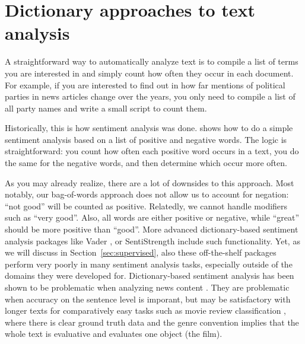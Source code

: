\section{Dictionary approaches to text analysis}
\label{sec:dictionary}

A straightforward way to automatically analyze text is to compile a
list of terms you are interested in and simply count how often they
occur in each document. For example, if you are interested to find out
in how far mentions of political parties in news articles change over
the years, you only need to compile a list of all party names and
write a small script to count them.

Historically, this is how sentiment analysis was
done.  shows how to do a simple sentiment analysis
based on a list of positive and negative words. The logic is
straightforward: you count how often each positive word occurs in a
text, you do the same for the negative words, and then determine which
occur more often.




As you may already realize, there are a lot of downsides to this
approach. Most notably, our bag-of-words approach does not allow us to
account for negation: ``not good'' will be counted as
positive. Relatedly, we cannot handle modifiers such as ``very
good''. Also, all words are either positive or negative, while
``great'' should be more positive than ``good''. More advanced
dictionary-based sentiment analysis packages like Vader \citep{Hutto2014},
or SentiStrength \citep{Thelwall2012} include such functionality. Yet, as we will
discuss in Section~\ref{sec:supervised}, also these off-the-shelf
packages perform very poorly in many sentiment analysis tasks,
especially outside of the domains they were developed for.
Dictionary-based sentiment analysis has been shown to be problematic
when analyzing news content \citep[e.g.][]{Gonzalez-Bailon2015,
  Boukes2019}. They are problematic when accuracy on the sentence
level is imporant, but may be satisfactory with longer texts for
comparatively easy tasks such as movie review classification
\citep{Reagan2017}, where there is clear ground truth data and the
genre convention implies that the whole text is evaluative and
evaluates one object (the film).


